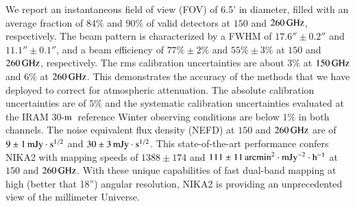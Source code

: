 \documentclass[traditionalabstract]{aa}
\newcommand{\trentemetre}{30-$\rm{m}$}
\newcommand{\lp}[1]{#1}
\begin{document}
       {We report an instantaneous field of view (FOV) of 6.5'
         in diameter, filled with an average fraction of $84\%$ and 
         $90\%$ of %
         valid detectors
         at $150$ and $260\,\rm{GHz}$, respectively. The beam pattern
         is characterized by a FWHM of $17.6'' \pm 0.2''$
         and  $11.1''\pm 0.1''$, and a beam efficiency of
         $77\% \pm 2\%$ and $55\% \pm 3\%$
         at $150$ and $260\,\rm{GHz}$, respectively.
         The rms calibration uncertainties are about $3\%$ at $150\,\rm{GHz}$ 
         and $6\%$ at $260\,\rm{GHz}$. This demonstrates
         the accuracy of the methods that we have deployed to correct
         for atmospheric attenuation. {\lp The absolute
           calibration uncertainties are of $5\%$ and the systematic
           calibration uncertainties evaluated at the IRAM
           \trentemetre\ reference Winter observing conditions are
           below $1\%$ in both channels.}
         The noise equivalent
         flux density (NEFD) at $150$ and $260\,\rm{GHz}$ are of
         $9 \pm 1\, \rm{mJy}\cdot s^{1/2}$ and
         $30 \pm 3\, \rm{mJy}\cdot s^{1/2}$. 
         This state-of-the-art performance confers NIKA2 with
         mapping speeds of $1388 \pm 174$ and
         $111 \pm 11 \, \rm{arcmin}^2\cdot \rm{mJy}^{-2}\cdot
         \rm{h}^{-1}$
         at $150$ and $260\,\rm{GHz}$.}
       {With these unique capabilities of fast dual-band mapping at
         high (better that 18'') angular resolution, NIKA2 is providing an unprecedented view
         of the millimeter Universe.}      
   \maketitle
\end{document}
